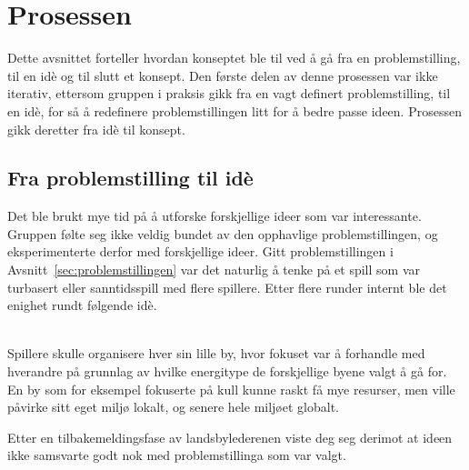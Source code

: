 \section{Prosessen}
Dette avsnittet forteller hvordan konseptet ble til ved å gå fra en
problemstilling, til en idè og til slutt et konsept. Den første delen av
denne prosessen var ikke iterativ, ettersom gruppen i praksis gikk fra en
vagt definert problemstilling, til en idè, for så å redefinere
problemstillingen litt for å bedre passe ideen. Prosessen gikk deretter
fra idè til konsept.
\subsection{Fra problemstilling til idè}
Det ble brukt mye tid på å utforske forskjellige ideer som var
interessante. Gruppen følte seg ikke veldig bundet av den opphavlige
problemstillingen, og eksperimenterte derfor med forskjellige ideer.
Gitt problemstillingen i Avsnitt~\ref{sec:problemstillingen} var det
naturlig å tenke på et spill som var turbasert eller sanntidsspill med
flere spillere.  Etter flere runder internt ble det enighet rundt
følgende idè.
\begin{description}\label{sec:energymp}
\item[Energispillet med flerspillermodus] \hfill\\
Spillere skulle organisere hver sin lille by, hvor fokuset var å
forhandle med hverandre på grunnlag av hvilke energitype de forskjellige
byene valgt å gå for. En by som for eksempel fokuserte på kull kunne
raskt få mye resurser, men ville påvirke sitt eget miljø lokalt, og
senere hele miljøet globalt.
\end{description}
Etter en tilbakemeldingsfase av landsbylederenen viste deg seg derimot
at ideen ikke samsvarte godt nok med problemstillinga som var valgt.

